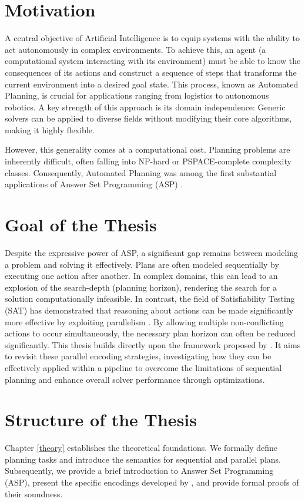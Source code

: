 \documentclass[
     11pt,                    %
     a4paper,             %
     BCOR=10mm,     %
     DIV=14,                 %
     listof=totoc,                    %
     bibliography=totoc,       %
     index=totoc,              %
     parskip            %
     twoside,
     headsepline
     ]{scrreprt}
\theoremstyle{definition}
\theoremstyle{definition}
\theoremstyle{remark}
\theoremstyle{bfnote}
\begin{document}
\section{Motivation}
A central objective of Artificial Intelligence is to equip systems with the ability to act autonomously in complex environments. 
To achieve this, an agent (a computational system interacting with its environment) must be able to know the consequences of its actions and construct a sequence of steps that transforms the current environment into a desired goal state. 
This process, known as Automated Planning, is crucial for applications ranging from logistics to autonomous robotics. 
A key strength of this approach is its domain independence: Generic solvers can be applied to diverse fields without modifying their core algorithms, making it highly flexible.

However, this generality comes at a computational cost. Planning problems are inherently difficult, often falling into NP-hard or PSPACE-complete complexity classes.
Consequently, Automated Planning was among the first substantial applications of Answer Set Programming (ASP) \parencite{Dimopoulos1997, LIFSCHITZ200239}. 

\section{Goal of the Thesis}
Despite the expressive power of ASP, a significant gap remains between modeling a problem and solving it effectively. 
Plans are often modeled sequentially by executing one action after another. 
In complex domains, this can lead to an explosion of the search-depth (planning horizon), rendering the search for a solution computationally infeasible.
In contrast, the field of Satisfiability Testing (SAT) has demonstrated that reasoning about actions can be made significantly more effective by exploiting parallelism \parencite{Kautz1996}. 
By allowing multiple non-conflicting actions to occur simultaneously, the necessary plan horizon can often be reduced significantly.
This thesis builds directly upon the framework proposed by \textcite{DIMOPOULOS_2019}. 
It aims to revisit these parallel encoding strategies, investigating how they can be effectively applied within a  pipeline to overcome the limitations of sequential planning and enhance overall solver performance through optimizations.


\section{Structure of the Thesis}
Chapter \ref{theory} establishes the theoretical foundations. We formally define planning tasks and introduce the semantics for sequential and parallel plans. Subsequently, we provide a brief introduction to Answer Set Programming (ASP), present the specific encodings developed by \textcite{DIMOPOULOS_2019}, and provide formal proofs of their soundness.
\end{document}

